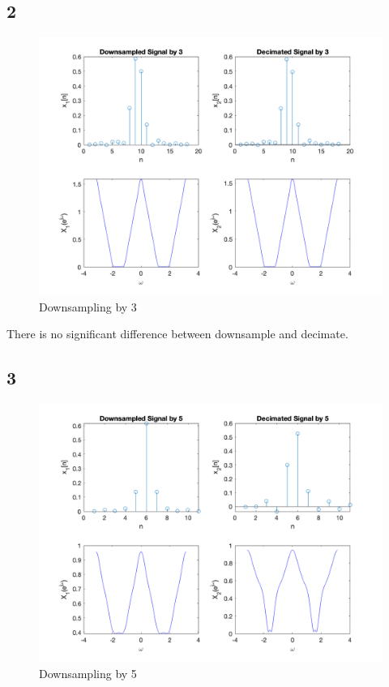 \documentclass{article}
\begin{document}
\subsection*{2}

\begin{figure}[H]
    \centering
    \includegraphics[scale = 0.4]{Downsample 3.png}
    \caption{Downsampling by 3}
    \label{Downsampling by 3}
\end{figure}

There is no significant difference between downsample and decimate. 


\subsection*{3}

\begin{figure}[H]
    \centering
    \includegraphics[scale = 0.4]{Downsample 5.png}
    \caption{Downsampling by 5}
    \label{Downsampling by 5}
\end{figure}
\end{document}
